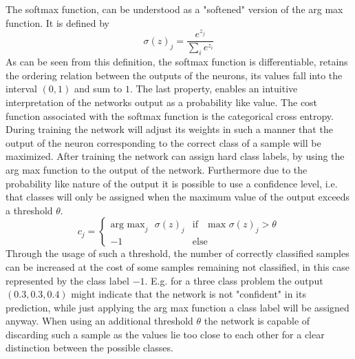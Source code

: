 The softmax function, can be understood as a "softened" version of the arg max function. It is defined by
\begin{equation}
\sigma(z)_j = \frac{e^{z_j}}{\sum_i e^{z_i}}
\end{equation}
As can be seen from this definition, the softmax function is differentiable, retains the ordering relation between the outputs of the neurons, its values fall into the interval $(0,1)$ and sum to $1$. The last property, enables an intuitive interpretation of the networks output as a probability like value. The cost function associated with the softmax function is the categorical cross entropy. During training the network will adjust its weights in such a manner that the output of the neuron corresponding to the correct class of a sample will be maximized. After training the network can assign hard class labels, by using the arg max function to the output of the network. Furthermore due to the probability like nature of the output it is possible to use a confidence level, i.e. that classes will only be assigned when the maximum value of the output exceeds a threshold $\theta$. 
\begin{equation}
c_j = \begin{cases}
\text{arg max}_j\text{ } \sigma(z)_j & \text{if}\quad \text{max } \sigma(z)_j>\theta \\
-1 & \text{else}
\end{cases}
\end{equation}
Through the usage of such a threshold, the number of correctly classified samples can be increased at the cost of some samples remaining not classified, in this case represented by the class label $-1$. E.g. for a three class problem the output $(0.3,0.3,0.4)$ might indicate that the network is not "confident" in its prediction, while just applying the arg max function a class label will be assigned anyway. When using an additional threshold $\theta$ the network is capable of discarding such a sample as the values lie too close to each other for a clear distinction between the possible classes.

